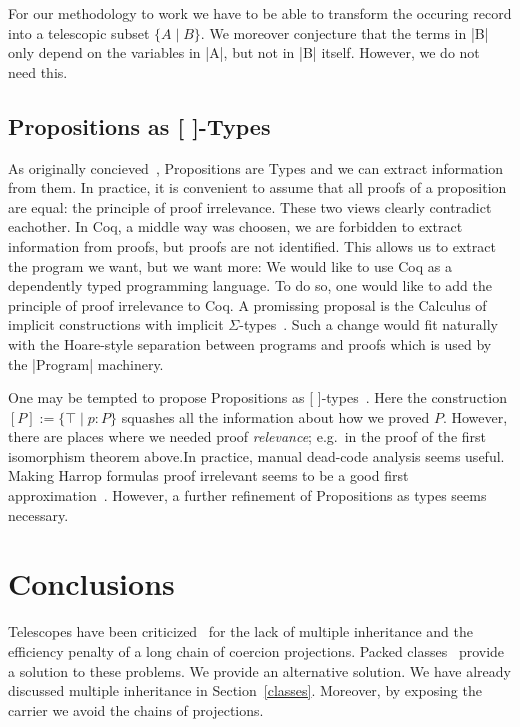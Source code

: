 \documentclass[a4paper,10pt, runningheads]{llncs}
\begin{document}
For our methodology to work we have to be able to transform the occuring record into a telescopic
subset $\{ A \mid  B\}$. We moreover conjecture that the terms in |B| only depend on the
variables in |A|, but not in |B| itself. However, we do not need this.

\subsection{Propositions as [ ]-Types}\label{explicit}
As originally concieved~\cite{ITT,CMCP}, Propositions are Types and we can extract information from
them. In practice, it is convenient to assume that all proofs of a proposition are equal: the
principle of proof irrelevance. These two views clearly contradict eachother. In Coq, a middle way
was choosen, we are forbidden to extract information from proofs, but proofs are not identified.
This allows us to extract the program we want, but we want more:
We would like to use Coq as a dependently typed programming language. To do so,
one would like to add the principle of proof irrelevance to Coq. A promissing proposal is the
Calculus of implicit constructions with implicit
$\Sigma$-types~\cite{miquel2001implicit,barras2008implicit,barrasSigma}. Such a change would fit
naturally with the Hoare-style separation between programs and proofs which is used by the |Program|
machinery. 

One may be tempted to propose Propositions as [ ]-types~\cite{awodey2004propositions}. Here the
construction $[P]:=\{\top\mid p:P\}$ squashes all the information about how we proved $P$. However,
there are places where we needed proof \emph{relevance}; e.g.\ in the proof of the first isomorphism
theorem above.In practice, manual dead-code analysis seems useful. Making Harrop formulas proof
irrelevant seems to be a good first approximation~\cite{lcf:spi:03}. However, a further refinement
of Propositions as types seems necessary.

\section{Conclusions}
Telescopes have been criticized~\cite{Packed} for the lack of multiple inheritance and
the efficiency penalty of a long chain of coercion projections. Packed classes~\cite{Packed} provide
a solution to these problems. We provide an alternative solution. We have already
discussed multiple inheritance in Section~\ref{classes}. Moreover, by exposing the
carrier we avoid the chains of projections.
\end{document}
